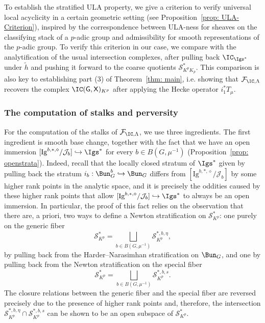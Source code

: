 \documentclass[letterpaper,11pt]{amsart}
\begin{document}
To establish the stratified ULA property, we give a criterion to verify universal local acyclicity in a certain geometric setting (see Proposition~\ref{prop: ULA-Criterion}), inspired by the correspondence between ULA-ness for sheaves on the classifying stack of a $p$-adic group and admissibility for smooth representations of the $p$-adic group. To verify this criterion in our case, we compare with the analytification of the usual intersection complexes, after pulling back $\IC_{\Igs^*}$ under $\tilde{h}$ and pushing it forward to the coarse quotients $\mathcal{S}^*_{K^pK_p}$. This comparison is also key to establishing part (3) of Theorem~\ref{thm: main}, i.e. showing that $\mathcal{F}_{\IC,\Lambda}$ recovers the complex  $\IC(\mathsf{G},\mathsf{X})_{K^p}$ after applying the Hecke operator $i_1^*T_\mu$. 


\subsubsection{The computation of stalks and perversity} 
For the computation of the stalks of $\mathcal{F}_{\IC,\Lambda}$, we use three ingredients. The first ingredient is smooth base change, together with the fact that we have an open immersion $[\mathrm{Ig}^{b,*,\diamond}/\mathcal{J}_b]\hookrightarrow \Igs^*$ for every $b\in B(G,\mu^{-1})$ (Proposition~\ref{prop: openstrata}). Indeed, recall that the locally closed stratum of $\Igs^{*}$ given by pulling back the stratum $i_{b}: \Bun_{G}^{b} \hookrightarrow \Bun_{G}$ differs from $[\mathrm{Ig}^{b,*,\diamond}/\mathcal{J}_b]$ by some higher rank points in the analytic space, and it is precisely the oddities caused by these higher rank points that allow $[\mathrm{Ig}^{b,*,\diamond}/\mathcal{J}_b]\hookrightarrow \Igs^*$ to always be an open immersion. In particular, the proof of this fact relies on the observation that there are, a priori, two ways to define a Newton stratification on $\mathcal{S}^*_{K^p}$: one purely on the generic fiber
\[
\mathcal{S}^*_{K^p} = \bigsqcup_{b\in B(G,\mu^{-1})} \mathcal{S}_{K^p}^{*,b,\eta},
\]
by pulling back from the Harder--Narasimhan stratification on $\Bun_G$, and one by pulling back from the Newton stratification on the special fiber
\[
\mathcal{S}^*_{K^p} = \bigsqcup_{b\in B(G,\mu^{-1})} \mathcal{S}_{K^p}^{*,b,s}.
\] 
The closure relations between the generic fiber and the special fiber are reversed precisely due to the presence of higher rank points and, therefore, the intersection $\mathcal{S}_{K^p}^{*,b,\eta}\cap \mathcal{S}_{K^p}^{*,b,s}$ can be shown to be an open subspace of $\mathcal{S}^*_{K^p}$. 
\end{document}
